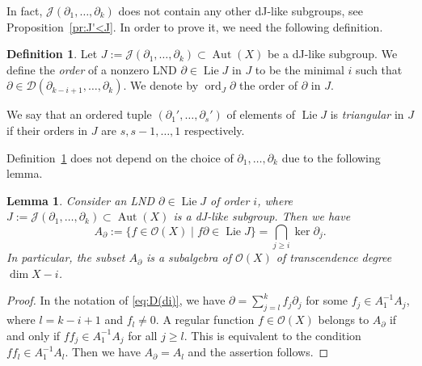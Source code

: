 \documentclass[12pt,a4paper]{amsart}
\theoremstyle{plain}
\newtheorem{lemma}[theorem]{Lemma}
\theoremstyle{definition}
\newtheorem{definition}[theorem]{Definition}
\theoremstyle{remark}
\def\Aut{\operatorname{Aut}}
\def\Lie{\operatorname{Lie}}
\def\ord{\operatorname{ord}}
\def\cO{{\mathcal O}}
\def\J{{\mathcal J}}
\begin{document}
In fact, $\J(\partial_1,\ldots,\partial_k)$ does not contain any other dJ-like subgroups, see Proposition~\ref{pr:J'<J}.
In order to prove it, we need the following definition.


   \begin{definition}\label{def:d-dJ-order}
      Let $J:=\J(\partial_1,\ldots,\partial_k)\subset \Aut(X)$ be a dJ-like subgroup.
      We define the \emph{order} of a nonzero LND $\partial\in\Lie J$ in $J$ to be the minimal $i$ such that $\partial\in\mathcal{D}(\partial_{k-i+1},\ldots,\partial_k)$.
      We denote by  $\ord_J\partial$  the order of $\partial$ in $J$.

      We say that an ordered tuple $(\partial_1',\ldots,\partial_s')$ of elements of $\Lie J$ is \emph{triangular} in $J$ if their orders in $J$ are $s,s-1,\ldots,1$ respectively.
   \end{definition}

    Definition~\ref{def:d-dJ-order} does not depend on the choice of $\partial_1,\ldots,\partial_k$ due to the following lemma. 

   \begin{lemma}\label{lm:d-ord}
      Consider an LND $\partial\in\Lie J$ of order $i$, where $J:=\J(\partial_1,\ldots,\partial_k)\subset \Aut(X)$ is a dJ-like subgroup.
      Then we have
      \[
         A_\partial:=\{f\in \cO(X)\mid f\partial\in \Lie J\}=\bigcap_{j\ge i}\ker\partial_j.
      \] 
      In particular, the subset $A_\partial$ is a subalgebra of $\cO(X)$ of transcendence degree $\dim X-i$.
   \end{lemma}
   \begin{proof}
      In the notation of \eqref{eq:D(di)},
       we have $\partial=\sum_{j=l}^k f_j\partial_j$ for some $f_j\in A_1^{-1}A_j$, where $l=k-i+1$ and $f_{l}\neq 0$.
      A regular function $f\in\cO(X)$ belongs to $A_\partial$ if and only if $ff_j\in A_1^{-1}A_j$ for all $j\ge l$.
      This is equivalent to the condition $ff_{l}\in A_1^{-1}A_{l}$.
      Then we have $A_\partial=A_l$ and the assertion follows.
   \end{proof}
   
\end{document}
